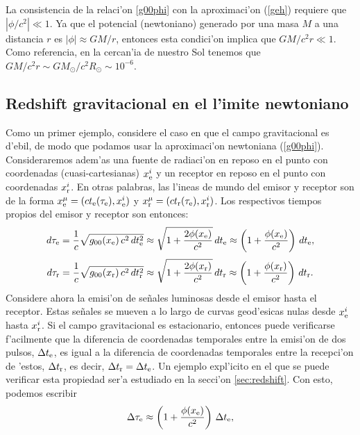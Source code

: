 La consistencia de la relaci'on \eqref{g00phi} con la aproximaci'on (\ref{geh}) requiere que $|{\phi}/{c^2}|\ll 1$. Ya que el potencial (newtoniano) generado por una masa $M$ a una distancia $r$ es $|\phi|\approx {GM}/{r}$, entonces esta condici'on implica que ${GM}/{c^2r}\ll 1$. Como referencia, en la cercan'ia de nuestro Sol tenemos que ${GM}/{c^2r}\sim {GM_\odot}{/c^2R_\odot}\sim 10^{-6}$.


\subsection{Redshift gravitacional en el l'imite newtoniano}\label{zg1}

Como un primer ejemplo, considere el caso en que el campo gravitacional es d'ebil, de modo que podamos usar la aproximaci'on newtoniana (\ref{g00phi}). Consideraremos adem'as una fuente de radiaci'on en reposo en el punto con coordenadas (cuasi-cartesianas) $x^i_{\rm e}$ y un receptor en reposo en el punto con coordenadas $x^i_{\rm r}$. En otras palabras, las l'ineas de mundo del emisor y receptor son de la forma $x^\mu_{\rm e}=(ct_{\rm e}(\tau_{\rm e}),x^i_{\rm e})$ y $x^\mu_{\rm r}=(ct_{\rm r}(\tau_{\rm e}),x^i_{\rm r})$. Los respectivos tiempos propios del emisor y receptor son entonces:
\begin{equation}
 d\tau_{\rm e}=\frac{1}{c}\sqrt{g_{00}(x_{\rm e})\,c^2\,dt^2_{\rm e}}\approx \sqrt{1+\frac{2\phi(x_{\rm e})}{c^2}}\,dt_{\rm e}\approx \left(1+\frac{\phi(x_{\rm e})}{c^2}\right)\,dt_{\rm e},
\end{equation}
\begin{equation}
 d\tau_{\rm r}=\frac{1}{c}\sqrt{g_{00}(x_{\rm r})\,c^2\,dt^2_{\rm r}}\approx \sqrt{1+\frac{2\phi(x_{\rm r})}{c^2}}\,dt_{\rm r}\approx \left(1+\frac{\phi(x_{\rm r})}{c^2}\right)\,dt_{\rm r}.
\end{equation}
Considere ahora la emisi'on de se\~nales luminosas desde el emisor hasta el receptor. Estas se\~nales se mueven a lo largo de curvas geod'esicas nulas desde $x^i_{\rm e}$ hasta $x^i_{\rm r}$. Si el campo gravitacional es estacionario, entonces puede verificarse f'acilmente que la diferencia de coordenadas temporales entre la emisi'on de dos pulsos, $ \Delta t_{\rm e}$, es igual a la diferencia de coordenadas temporales entre la recepci'on de 'estos, $ \Delta t_{\rm r}$, es decir, $ \Delta t_{\rm r}= \Delta t_{\rm e}$. Un ejemplo expl'icito en el que se puede verificar esta propiedad ser'a estudiado en la secci'on \ref{sec:redshift}. Con esto, podemos escribir
\begin{equation}
 \Delta\tau_{\rm e}\approx \left(1+\frac{\phi(x_{\rm e})}{c^2}\right)\, \Delta t_{\rm e},
\end{equation}
